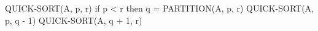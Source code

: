 \begin{pseudocode}[caption={Algoritmo de ordenação por particionamento}, label={quickSortP}]
QUICK-SORT(A, p, r)
if p < r then
    q = PARTITION(A, p, r)
    QUICK-SORT(A, p, q - 1)
    QUICK-SORT(A, q + 1, r)
\end{pseudocode}